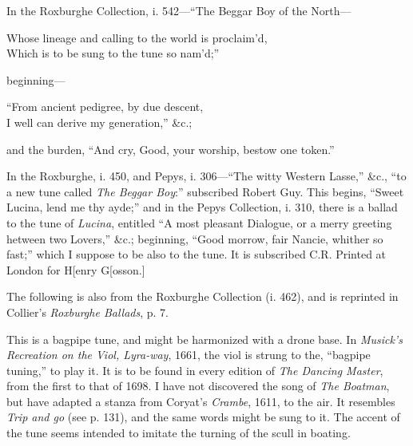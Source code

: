 In the Roxburghe Collection, i. 542—“The Beggar Boy of the North—
\settowidth{\versewidth}{Whose lineage and calling to the world is proclaim’d,}
\begin{scverse}Whose lineage and calling to the world is proclaim’d,\\
Which is to be sung to the tune so nam’d;”
\end{scverse}
beginning—
\begin{scverse}“From ancient pedigree, by due descent,\\
I well can derive my generation,” \&c.;
\end{scverse}
and the burden, “And cry, Good, your worship, bestow one token.”

In the Roxburghe, i. 450, and Pepys, i. 306—“The witty Western Lasse,” \&c.,
“to a new tune called \textit{The Beggar Boy}:” subscribed Robert Guy. This begins,
“Sweet Lucina, lend me thy ayde;” \pagebreak and in the Pepys Collection, i. 310, there is
a ballad to the tune of \textit{Lucina}, entitled “A most pleasant Dialogue, or a merry
greeting hetween two Lovers,” \&c.; beginning, “Good morrow, fair Nancie,
whither so fast;” which I suppose to be also to the tune. It is subscribed C.R.
Printed at London for H[enry G[osson.]

The following is also from the Roxburghe Collection (i. 462), and is reprinted
in Collier’s \textit{Roxburghe Ballads}, p. 7.




This is a bagpipe tune, and might be harmonized with a drone base. In
\textit{Musick’s Recreation on the Viol, Lyra-way}, 1661, the viol is strung to the, “bagpipe
tuning,” to play it. It is to be found in every edition of \textit{The Dancing Master},
from the first to that of 1698. I have not discovered the song of \textit{The Boatman},
but have adapted a stanza from Coryat’s \textit{Crambe}, 1611, to the air. It resembles
\textit{Trip and go} (see p. 131), and the same words might be sung to it. The accent
of the tune seems intended to imitate the turning of the scull in boating.

